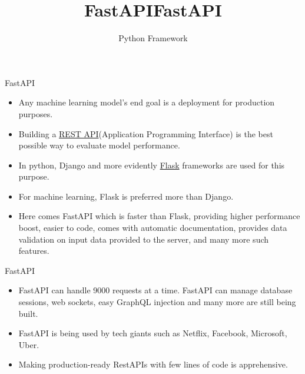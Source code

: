 \documentclass[aspectratio=169,12pt,usenames,dvipsnames]{beamer}
\title[FastAPI]{FastAPI}
\begin{document}
{\1
\begin{frame} \vspace{35pt}
	\title[FastAPI]{FastAPI}
	\subtitle{Python Framework}
	\maketitle
\end{frame}
}

\begin{frame}[t]{FastAPI}
\begin{itemize}
  \item Any machine learning model's end goal is a deployment for production purposes.

  \item Building a \href{https://analyticsindiamag.com/the-pricing-plans-for-openais-api-is-out-it-is-not-cheap/}{REST API}(Application Programming Interface) is the best possible way to evaluate model performance.

  \item In python, Django and more evidently \href{https://analyticsindiamag.com/hands-on-guide-to-machine-learning-model-deployment-using-flask/}{Flask} frameworks are used for this purpose.

  \item For machine learning, Flask is preferred more than Django.

  \item Here comes FastAPI which is faster than Flask, providing higher performance boost, easier to code, comes with automatic documentation, provides data validation on input data provided to the server, and many more such features.

\end{itemize}
\end{frame}



\begin{frame}[t]{FastAPI}
\begin{itemize}
\item FastAPI can handle 9000 requests at a time. FastAPI can manage database sessions, web sockets, easy GraphQL injection and many more are still being built.
\item FastAPI is being used by tech giants such as Netflix, Facebook, Microsoft, Uber.
\item Making production-ready RestAPIs with few lines of code is apprehensive.
\end{itemize}
\end{frame}
\end{document}
